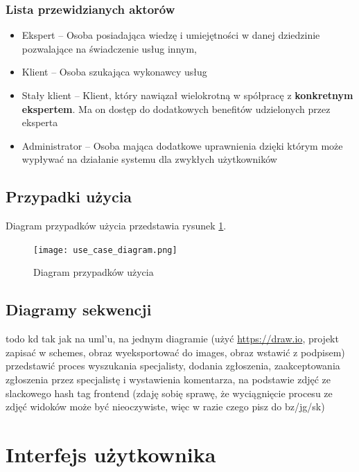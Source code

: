 \documentclass[10pt, titlepage, oneside, a4paper]{article}
\begin{document}
	\subsubsection*{Lista przewidzianych aktorów}
	\begin{itemize}
		\item Ekspert -- Osoba posiadająca wiedzę i umiejętności w danej dziedzinie pozwalające na świadczenie usług innym,
		\item Klient -- Osoba szukająca wykonawcy usług
		\item Stały klient -- Klient, który nawiązał wielokrotną w spółpracę z \textbf{konkretnym ekspertem}. Ma on dostęp do dodatkowych benefitów udzielonych przez eksperta
		\item Administrator -- Osoba mająca dodatkowe uprawnienia dzięki którym może wypływać na działanie systemu dla zwykłych użytkowników
	\end{itemize}
	
  \subsection{Przypadki użycia}
  Diagram przypadków użycia przedstawia rysunek \ref{fig:ucDiagram}.

  \begin{figure}[h]
	  \centering
	  \texttt{[image: use\_case\_diagram.png]}
	  \caption{Diagram przypadków użycia}
	  \label{fig:ucDiagram}
  \end{figure}
  
  \subsection{Diagramy sekwencji}
	todo kd tak jak na uml'u, na jednym diagramie (użyć \url{https://draw.io}, projekt zapisać w schemes, obraz wyeksportować do images, obraz wstawić z podpisem) przedstawić proces wyszukania specjalisty, dodania zgłoszenia, zaakceptowania zgłoszenia przez specjalistę i wystawienia komentarza, na podstawie zdjęć ze slackowego hash tag frontend (zdaję sobię sprawę, że wyciągnięcie procesu ze zdjęć widoków może być nieoczywiste, więc w razie czego pisz do bz/jg/sk)
	\newpage
  
	\section{Interfejs użytkownika}
  
\end{document}
